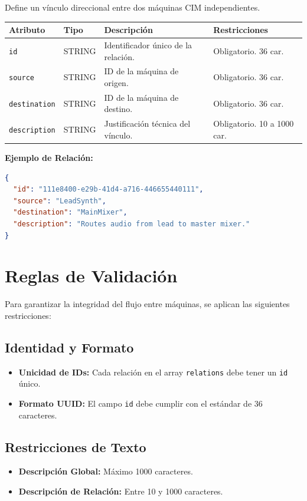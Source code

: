 Define un vínculo direccional entre dos máquinas CIM independientes.

\begin{table}[H]
\centering
\small
\begin{tabular}{@{}llp{4cm}l@{}}
\toprule
Atributo & Tipo & Descripción & Restricciones \\ \midrule
\texttt{id} & STRING & Identificador único de la relación. & Obligatorio. 36 car. \\
\texttt{source} & STRING & ID de la máquina de origen. & Obligatorio. 36 car. \\
\texttt{destination} & STRING & ID de la máquina de destino. & Obligatorio. 36 car. \\
\texttt{description} & STRING & Justificación técnica del vínculo. & Obligatorio. 10 a 1000 car. \\ \bottomrule
\end{tabular}
\end{table}

\textbf{Ejemplo de Relación:}
\begin{lstlisting}[language=json]
{
  "id": "111e8400-e29b-41d4-a716-446655440111",
  "source": "LeadSynth",
  "destination": "MainMixer",
  "description": "Routes audio from lead to master mixer."
}
\end{lstlisting}

\section{Reglas de Validación}

Para garantizar la integridad del flujo entre máquinas, se aplican las siguientes restricciones:

\subsection{Identidad y Formato}
\begin{itemize}
    \item \textbf{Unicidad de IDs:} Cada relación en el array \texttt{relations} debe tener un \texttt{id} único.
    \item \textbf{Formato UUID:} El campo \texttt{id} debe cumplir con el estándar de 36 caracteres.
\end{itemize}

\subsection{Restricciones de Texto}
\begin{itemize}
    \item \textbf{Descripción Global:} Máximo 1000 caracteres.
    \item \textbf{Descripción de Relación:} Entre 10 y 1000 caracteres.
\end{itemize}

